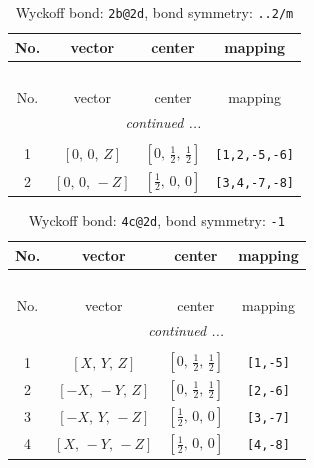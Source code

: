 \documentclass[fleqn,8pt]{jsarticle}
\begin{document}
\renewcommand{\arraystretch}{1.2}
\begin{longtable}{cccc}
\caption{Wyckoff bond: {\tt 2b@2d}, bond symmetry: {\tt ..2/m}}
 \\
 \hline \hline
No. & vector & center & mapping \\ \hline \endfirsthead

\multicolumn{3}{l}{\tablename\ \thetable{}} \\
 \hline \hline
No. & vector & center & mapping \\ \hline \endhead

 \hline \hline
\multicolumn{3}{r}{\footnotesize\it continued ...} \\ \endfoot

 \hline \hline
\multicolumn{3}{r}{} \\ \endlastfoot

1 & $\left[ 0,\, 0,\, Z \right]$ & $\left[ 0,\, \frac{1}{2},\, \frac{1}{2} \right]$ & {\tt [1,2,-5,-6]} \\ \hline
2 & $\left[ 0,\, 0,\, - Z \right]$ & $\left[ \frac{1}{2},\, 0,\, 0 \right]$ & {\tt [3,4,-7,-8]} \\
\end{longtable}
\renewcommand{\arraystretch}{1.2}
\begin{longtable}{cccc}
\caption{Wyckoff bond: {\tt 4c@2d}, bond symmetry: {\tt -1}}
 \\
 \hline \hline
No. & vector & center & mapping \\ \hline \endfirsthead

\multicolumn{3}{l}{\tablename\ \thetable{}} \\
 \hline \hline
No. & vector & center & mapping \\ \hline \endhead

 \hline \hline
\multicolumn{3}{r}{\footnotesize\it continued ...} \\ \endfoot

 \hline \hline
\multicolumn{3}{r}{} \\ \endlastfoot

1 & $\left[ X,\, Y,\, Z \right]$ & $\left[ 0,\, \frac{1}{2},\, \frac{1}{2} \right]$ & {\tt [1,-5]} \\ \hline
2 & $\left[ - X,\, - Y,\, Z \right]$ & $\left[ 0,\, \frac{1}{2},\, \frac{1}{2} \right]$ & {\tt [2,-6]} \\ \hline
3 & $\left[ - X,\, Y,\, - Z \right]$ & $\left[ \frac{1}{2},\, 0,\, 0 \right]$ & {\tt [3,-7]} \\ \hline
4 & $\left[ X,\, - Y,\, - Z \right]$ & $\left[ \frac{1}{2},\, 0,\, 0 \right]$ & {\tt [4,-8]} \\
\end{longtable}
\end{document}
